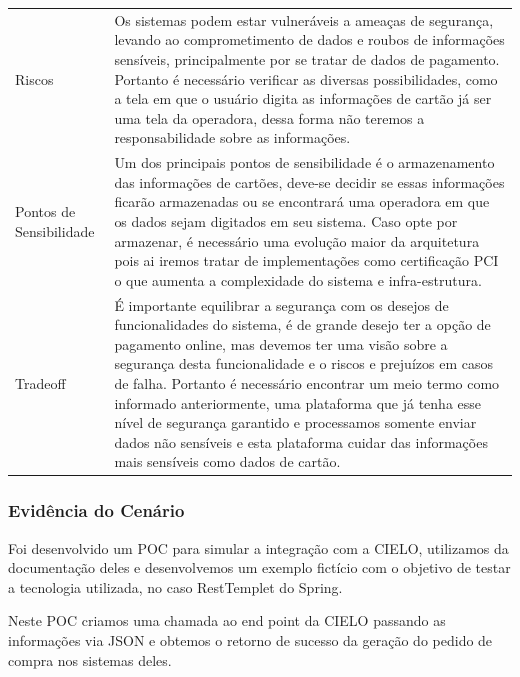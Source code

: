\begin{tabular}{|>{\raggedright\arraybackslash}p{3cm}|>{\raggedright\arraybackslash}p{10cm}|}
     \multicolumn{2}{|l|}{\cellcolor[gray]{0.8}Consideração sobre a arquitetura:} \\
     \hline  
     \cellcolor[gray]{0.8}Riscos & Os sistemas podem estar vulneráveis a ameaças de segurança, levando ao comprometimento de dados e roubos de informações sensíveis, principalmente por se tratar
     de dados de pagamento. Portanto é necessário verificar as diversas possibilidades, como a tela em que o usuário digita as informações de cartão já ser uma tela da operadora, dessa forma não teremos a responsabilidade sobre as informações. \\
     \hline           
     \cellcolor[gray]{0.8}Pontos de Sensibilidade & Um dos principais pontos de sensibilidade é o armazenamento das informações de cartões, deve-se decidir se essas informações ficarão armazenadas ou se encontrará uma operadora em que os dados sejam digitados em seu sistema.
     Caso opte por armazenar, é necessário uma evolução maior da arquitetura pois ai iremos tratar de implementações como certificação PCI o que aumenta a complexidade do sistema e infra-estrutura. \\
     \hline           
     \cellcolor[gray]{0.8}Tradeoff & É importante equilibrar a segurança com os desejos de funcionalidades do sistema, é de grande desejo ter a opção de pagamento online, mas devemos ter uma visão 
     sobre a segurança desta funcionalidade e o riscos e prejuízos em casos de falha. Portanto é necessário encontrar um meio termo como informado anteriormente, uma plataforma que já tenha esse nível de segurança garantido e processamos somente 
     enviar dados não sensíveis e esta plataforma cuidar das informações mais sensíveis como dados de cartão. \\
     \hline         
 \end{tabular}
 
 \subsubsection{Evidência do Cenário \avcen} 

 Foi desenvolvido um POC para simular a integração com a CIELO, utilizamos da documentação deles e desenvolvemos um exemplo fictício com o objetivo de testar a 
 tecnologia utilizada, no caso RestTemplet do Spring. 

 Neste POC criamos uma chamada ao end point da CIELO passando as informações via JSON e obtemos o retorno de sucesso da geração do pedido de compra nos sistemas deles.


